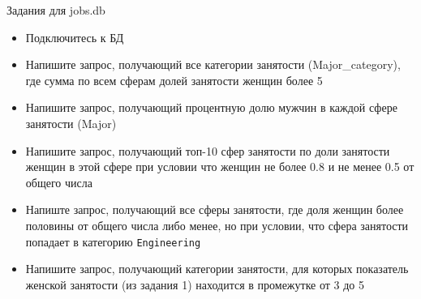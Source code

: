 \documentclass{beamer}
\begin{document}
\begin{frame}[fragile]{Задания для jobs.db}
	\begin{itemize}
		\item Подключитесь к БД
		\item Напишите запрос, получающий все категории занятости (Major\_category), где сумма по всем сферам долей занятости женщин более 5
		\item Напишите запрос, получающий процентную долю мужчин в каждой сфере занятости (Major)
		\item Напишите запрос, получающий топ-10 сфер занятости по доли занятости женщин в этой сфере при условии что женщин не более 0.8 и не менее 0.5 от общего числа
		\item Напиште запрос, получающий все сферы занятости, где доля женщин более половины от общего числа либо менее, но при условии, что сфера занятости попадает в категорию \texttt{Engineering}
		\item Напишите запрос, получающий категории занятости, для которых показатель женской занятости (из задания 1) находится в промежутке от 3 до 5
	\end{itemize}
\end{frame}
\end{document}
